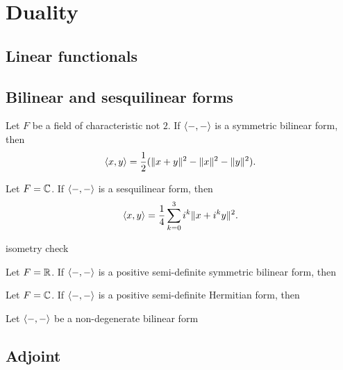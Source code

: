 \documentclass{../../large}
\begin{document}
\chapter{Duality}
\section{Linear functionals}

\begin{prb}
\end{prb}


\section{Bilinear and sesquilinear forms}

\begin{prb}
\begin{parts}
\item Let $F$ be a field of characteristic not $2$. If $\langle-,-\rangle$ is a symmetric bilinear form, then
\[\langle x,y\rangle=\frac12(\|x+y\|^2-\|x\|^2-\|y\|^2).\]
\item Let $F=\mathbb{C}$. If $\langle-,-\rangle$ is a sesquilinear form, then
\[\langle x,y\rangle=\frac14\sum_{k=0}^3i^k\|x+i^ky\|^2.\]
\item isometry check
\end{parts}
\end{prb}

\begin{prb}
\begin{parts}
\item Let $F=\mathbb{R}$. If $\langle-,-\rangle$ is a positive semi-definite symmetric bilinear form, then
\item Let $F=\mathbb{C}$. If $\langle-,-\rangle$ is a positive semi-definite Hermitian form, then
\end{parts}
\end{prb}

\begin{prb}
Let $\langle-,-\rangle$ be a non-degenerate bilinear form
\end{prb}


\section{Adjoint}
\begin{prb}
\end{prb}
\end{document}
